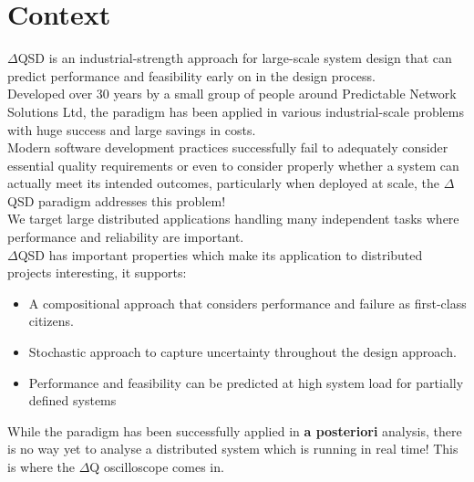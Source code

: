 \section{Context}
    $\Delta$QSD is an industrial-strength approach for large-scale system design that can predict performance and feasibility early on in the design process. \\ Developed over 30 years by a small group of people around Predictable Network Solutions Ltd, the paradigm has been applied in various industrial-scale problems with huge success and large savings in costs. \\
    Modern software development practices successfully fail to adequately consider essential quality requirements or even to consider properly whether a system can actually meet its intended outcomes, particularly when deployed at scale, the $\Delta$QSD paradigm addresses this problem! \\
    We target large distributed applications handling many independent tasks where performance and reliability are important. \\ 
    $\Delta$QSD has important properties which make its application to distributed projects interesting, it supports:
    \begin{itemize}
        \item A compositional approach that considers performance and failure as first-class citizens. 
        \item Stochastic approach to capture uncertainty throughout the design approach.
        \item Performance and feasibility can be predicted at high system load for partially defined systems
    \end{itemize}
    While the paradigm has been successfully applied in \textbf{a posteriori} analysis, there is no way yet to analyse a distributed system which is running in real time! This is where the $\Delta$Q oscilloscope comes in. 
